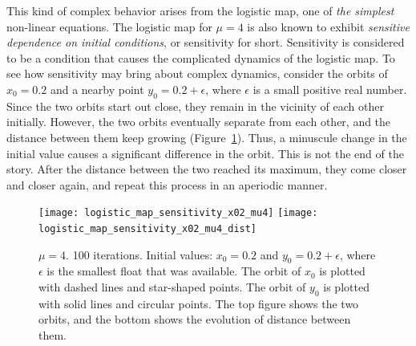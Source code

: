 \documentclass[10pt,twoside,draft]{book}
\begin{document}
This kind of complex behavior arises from the logistic map, one of \textit{the simplest} non-linear equations.
The logistic map for $\mu = 4$ is also known to exhibit \textit{sensitive dependence on initial conditions}, or sensitivity for short.
Sensitivity is considered to be a condition that causes the complicated dynamics of the logistic map.
To see how sensitivity may bring about complex dynamics, consider the orbits of $x_0 = 0.2$ and a nearby point $y_0 = 0.2 + \epsilon$, where $\epsilon$ is a small positive real number.
Since the two orbits start out close, they remain in the vicinity of each other initially.
However, the two orbits eventually separate from each other, and the distance between them keep growing (Figure~\ref{fig:logistic_sensitivity}).
Thus, a minuscule change in the initial value causes a significant difference in the orbit.
This is not the end of the story.
After the distance between the two reached its maximum, they come closer and closer again, and repeat this process in an aperiodic manner.
\begin{figure}[p]
  \centering
  \texttt{[image: logistic\_map\_sensitivity\_x02\_mu4]}
  \texttt{[image: logistic\_map\_sensitivity\_x02\_mu4\_dist]}
  \caption{
    $\mu = 4$. 100 iterations.
    Initial values: $x_0 = 0.2$ and $y_0 = 0.2 + \epsilon$, where $\epsilon$ is the smallest float that was available.
    The orbit of $x_0$ is plotted with dashed lines and star-shaped points.
    The orbit of $y_0$ is plotted with solid lines and circular points.
    The top figure shows the two orbits, and the bottom shows the evolution of distance between them.
  }
  \label{fig:logistic_sensitivity}
\end{figure}

\end{document}
